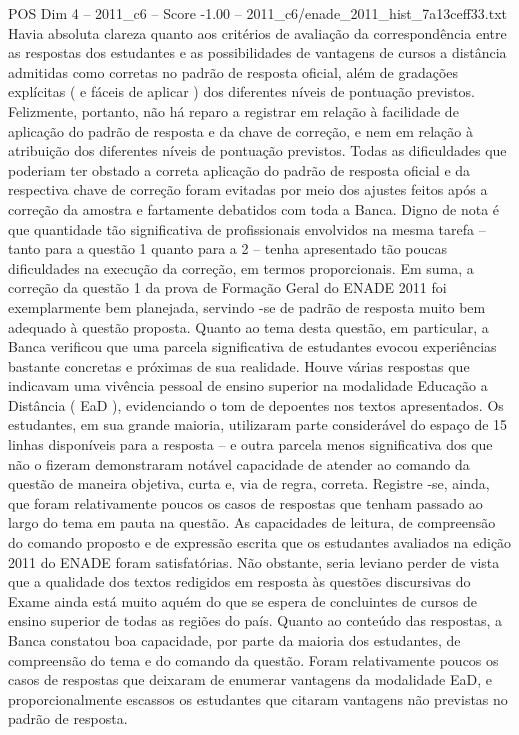 \begin{textsample}{POS Dim 4 – 2011\_c6 – Score -1.00 – 2011\_c6/enade\_2011\_hist\_7a13ceff33.txt}
Havia absoluta clareza quanto aos critérios de avaliação da correspondência entre as respostas dos estudantes e as possibilidades de vantagens de cursos a distância admitidas como corretas no padrão de resposta oficial, além de gradações explícitas ( e fáceis de aplicar ) dos diferentes níveis de pontuação previstos.
Felizmente, portanto, não há reparo a registrar em relação à facilidade de aplicação do padrão de resposta e da chave de correção, e nem em relação à atribuição dos diferentes níveis de pontuação previstos.
Todas as dificuldades que poderiam ter obstado a correta aplicação do padrão de resposta oficial e da respectiva chave de correção foram evitadas por meio dos ajustes feitos após a correção da amostra e fartamente debatidos com toda a Banca.
Digno de nota é que quantidade tão significativa de profissionais envolvidos na mesma tarefa – tanto para a questão 1 quanto para a 2 – tenha apresentado tão poucas dificuldades na execução da correção, em termos proporcionais.
Em suma, a correção da questão 1 da prova de Formação Geral do ENADE 2011 foi exemplarmente bem planejada, servindo -se de padrão de resposta muito bem adequado à questão proposta.
Quanto ao tema desta questão, em particular, a Banca verificou que uma parcela significativa de estudantes evocou experiências bastante concretas e próximas de sua realidade.
Houve várias respostas que indicavam uma vivência pessoal de ensino superior na modalidade Educação a Distância ( EaD ), evidenciando o tom de depoentes nos textos apresentados.
Os estudantes, em sua grande maioria, utilizaram parte considerável do espaço de 15 linhas disponíveis para a resposta – e outra parcela menos significativa dos que não o fizeram demonstraram notável capacidade de atender ao comando da questão de maneira objetiva, curta e, via de regra, correta.
Registre -se, ainda, que foram relativamente poucos os casos de respostas que tenham passado ao largo do tema em pauta na questão.
As capacidades de leitura, de compreensão do comando proposto e de expressão escrita que os estudantes avaliados na edição 2011 do ENADE foram satisfatórias.
Não obstante, seria leviano perder de vista que a qualidade dos textos redigidos em resposta às questões discursivas do Exame ainda está muito aquém do que se espera de concluintes de cursos de ensino superior de todas as regiões do país.
Quanto ao conteúdo das respostas, a Banca constatou boa capacidade, por parte da maioria dos estudantes, de compreensão do tema e do comando da questão.
Foram relativamente poucos os casos de respostas que deixaram de enumerar vantagens da modalidade EaD, e proporcionalmente escassos os estudantes que citaram vantagens não previstas no padrão de resposta.

\end{textsample}
